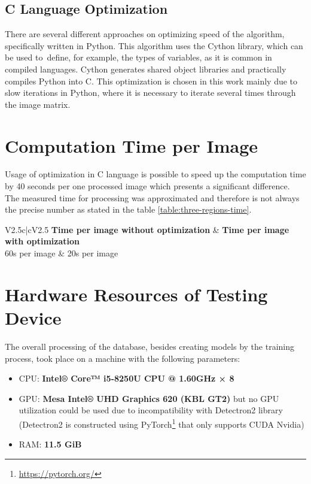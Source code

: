 \subsection{C Language Optimization}
\label{hw-optimization}
There are several different approaches on optimizing speed of the  algorithm, specifically written in Python. This algorithm uses the Cython \cite{cython} library, which can be used to~define, for example, the types of variables, as it is common in compiled languages. Cython generates shared object libraries and practically compiles Python into C. This optimization is chosen in this work mainly due to slow iterations in Python, where it is necessary to iterate several times through the image matrix.


\section{Computation Time per Image}
Usage of optimization in C language is possible to speed up the computation time by 40 seconds per one processed image which presents a significant difference. The measured time for processing was approximated and therefore is not always the precise number as stated in the table \ref{table:three-regions-time}.


\begin{table}[ht]
    \centering
    \vspace{1mm}
     \begin{tabular}{V{2.5}c|cV{2.5}}
        \textbf{Time per image without optimization} & \textbf{Time per image with optimization}\\ 
        60s per image & 20s per image \\ \hline
    \end{tabular}
    \caption{Time comparison of one image processing without and with optimization.}
    \label{table:three-regions-time}
\end{table}

\section{Hardware Resources of Testing Device}
The overall processing of the database, besides creating models by the training process, took place on a machine with the following parameters:

\begin{itemize}
    \item CPU: \textbf{Intel® Core™ i5-8250U CPU @ 1.60GHz × 8}
    \item GPU: \textbf{Mesa Intel® UHD Graphics 620 (KBL GT2)} but no GPU utilization could be used due to incompatibility with Detectron2 library (Detectron2 is constructed using PyTorch\footnote{\url{https://pytorch.org/}} that only supports CUDA Nvidia)
    \item RAM: \textbf{11.5 GiB}
    \
\end{itemize}



